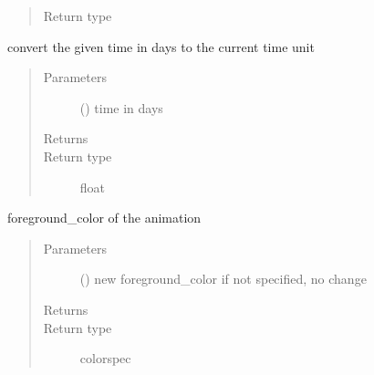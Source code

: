 \documentclass[letterpaper,10pt,english]{sphinxmanual}
\begin{document}
\begin{fulllineitems}
\begin{fulllineitems}
\begin{quote}
\begin{description}
\item[{Return type}] \leavevmode
{\hyperref[\detokenize{Reference:salabim.Component}]{}}

\end{description}\end{quote}

\end{fulllineitems}


\begin{fulllineitems}
\label{\detokenize{Reference:salabim.Environment.days}}
convert the given time in days to the current time unit
\begin{quote}\begin{description}
\item[{Parameters}] \leavevmode
{} () \textendash{} time in days

\item[{Returns}] \leavevmode
{}

\item[{Return type}] \leavevmode
float

\end{description}\end{quote}

\end{fulllineitems}


\begin{fulllineitems}
\label{\detokenize{Reference:salabim.Environment.foreground_color}}
foreground\_color of the animation
\begin{quote}\begin{description}
\item[{Parameters}] \leavevmode
{} () \textendash{} new foreground\_color 
if not specified, no change

\item[{Returns}] \leavevmode
{}

\item[{Return type}] \leavevmode
colorspec


\end{description}
\end{quote}
\end{fulllineitems}
\end{fulllineitems}
\end{document}
